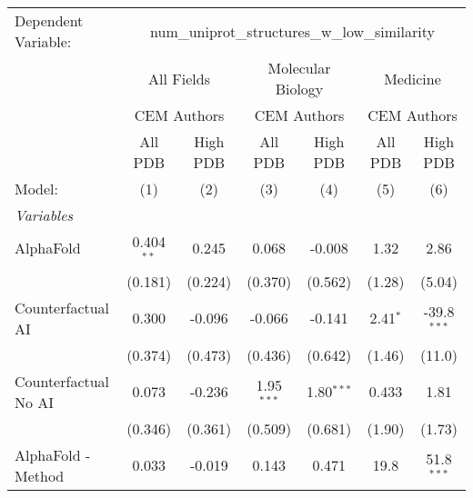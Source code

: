\begingroup
\centering
\begin{tabular}{lcccccc}
   \tabularnewline \midrule \midrule
   Dependent Variable: & \multicolumn{6}{c}{num\_uniprot\_structures\_w\_low\_similarity}\\
 & \multicolumn{2}{c}{All Fields} & \multicolumn{2}{c}{Molecular Biology} & \multicolumn{2}{c}{Medicine} \\
\cmidrule(lr){2-3} \cmidrule(lr){4-5} \cmidrule(lr){6-7}
 & \multicolumn{2}{c}{CEM Authors} & \multicolumn{2}{c}{CEM Authors} & \multicolumn{2}{c}{CEM Authors} \\
\cmidrule(lr){2-3} \cmidrule(lr){4-5} \cmidrule(lr){6-7}
 & \multicolumn{1}{c}{All PDB} & \multicolumn{1}{c}{High PDB} & \multicolumn{1}{c}{All PDB} & \multicolumn{1}{c}{High PDB} & \multicolumn{1}{c}{All PDB} & \multicolumn{1}{c}{High PDB} \\
\cmidrule(lr){2-2} \cmidrule(lr){3-3} \cmidrule(lr){4-4} \cmidrule(lr){5-5} \cmidrule(lr){6-6} \cmidrule(lr){7-7}
   Model:                                                     & (1)           & (2)          & (3)           & (4)           & (5)           & (6)\\  
   \midrule
   \emph{Variables}\\
   AlphaFold                                                  & 0.404$^{**}$  & 0.245        & 0.068         & -0.008        & 1.32          & 2.86\\   
                                                              & (0.181)       & (0.224)      & (0.370)       & (0.562)       & (1.28)        & (5.04)\\   
   Counterfactual AI                                          & 0.300         & -0.096       & -0.066        & -0.141        & 2.41$^{*}$    & -39.8$^{***}$\\   
                                                              & (0.374)       & (0.473)      & (0.436)       & (0.642)       & (1.46)        & (11.0)\\   
   Counterfactual No AI                                       & 0.073         & -0.236       & 1.95$^{***}$  & 1.80$^{***}$  & 0.433         & 1.81\\   
                                                              & (0.346)       & (0.361)      & (0.509)       & (0.681)       & (1.90)        & (1.73)\\   
   AlphaFold - Method                                         & 0.033         & -0.019       & 0.143         & 0.471         & 19.8          & 51.8$^{***}$\\   

\end{tabular}
